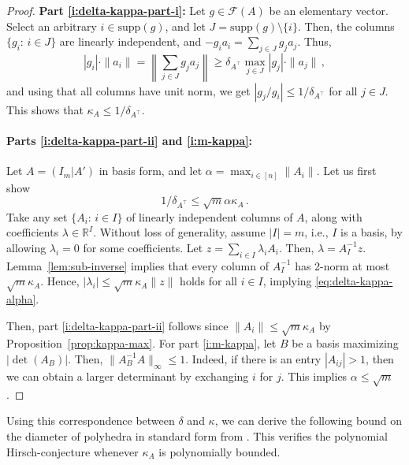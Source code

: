 \documentclass[11pt, a4paper]{article}
\newcommand{\Le}{\kappa}
\newcommand{\supp}{\mathrm{supp}}
\newcommand{\1}{\mathbbm{1}}
\newcommand{\EE}{\mathcal F}
\theoremstyle{case}
\newcommand{\R}{\mathbb{R}}
\begin{document}
\begin{proof}
{\bf Part \ref{i:delta-kappa-part-i}:} Let  $g\in\EE(A)$ be an elementary vector. Select an arbitrary $i\in \supp(g)$, and let $J=\supp(g)\setminus \{i\}$. Then, the columns $\{g_i:\,  i\in J\}$ are linearly independent, and $-g_i a_i=\sum_{j\in J} g_j a_j$. Thus,
\[
|g_i|\cdot\|a_i\|=\left\|\sum_{j\in J} g_j a_j\right\|\ge \delta_{A^\top} \max_{j\in J} |g_j|\cdot\|a_j\|\, ,
\]
and using that all columns have unit norm, we get $|g_j/g_i|\le 1/\delta_{A^\top}$ for all $j\in J$. This shows that $\kappa_{A}\le 1/\delta_{A^\top}$.

\paragraph{Parts \ref{i:delta-kappa-part-ii} and \ref{i:m-kappa}:} Let $A=(I_m|A')$ in basis form, and let $\alpha=\max_{i\in [n]} \|A_i\|$. Let us first show 
\begin{equation}\label{eq:delta-kappa-alpha}
{1}/{\delta_{A^\top}}\le \sqrt{m}\alpha \kappa_A\, .\end{equation}
 Take any set $\{A_i:\, i\in I\}$ of linearly independent columns of $A$, along with coefficients $\lambda\in \R^I$. Without loss of generality, assume $|I|=m$, i.e., $I$ is a basis, by allowing $\lambda_i=0$ for some coefficients. Let $z=\sum_{i\in I}\lambda_i A_i$. Then, $\lambda=A_I^{-1} z$. Lemma~\ref{lem:sub-inverse} implies that every column of $A_I^{-1}$ has 2-norm at most $\sqrt{m}\kappa_A$. Hence, $|\lambda_i|\le \sqrt{m}\kappa_A \|z\|$ holds for all $i\in I$, implying \eqref{eq:delta-kappa-alpha}.

 Then, part \ref{i:delta-kappa-part-ii} follows since $\|A_i\|\le \sqrt{m}\kappa_A$ by Proposition~\ref{prop:kappa-max}. For part \ref{i:m-kappa}, let  $B$ be a basis maximizing $|\det(A_B)|$. Then, $\|A_B^{-1} A\|_\infty\le 1$. Indeed, if there is an entry $|A_{ij}|>1$, then we can obtain a larger determinant by exchanging $i$ for $j$. This implies $\alpha\le \sqrt{m}$.
\end{proof}

Using this correspondence between $\delta$ and $\Le$, we can derive the following bound on the diameter of polyhedra in standard form from \cite{dadush2016shadow}. This verifies the polynomial Hirsch-conjecture whenever $\kappa_A$ is polynomially bounded.
\end{document}
